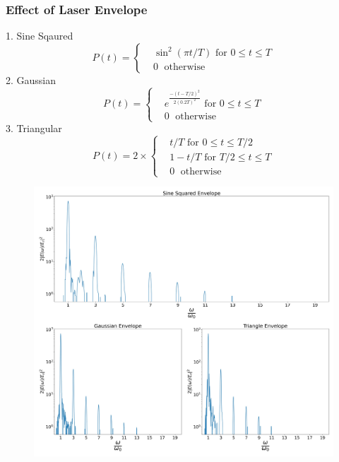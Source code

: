 \documentclass{beamer}
\begin{document}
\begin{frame}
    \frametitle{Effect of Laser Envelope}
    \tiny
    \begin{minipage}[t]{0.35\linewidth}
        1. Sine Sqaured
        \begin{equation*}\label{sin-sq-env}
            P(t)=
            \begin{cases}
                 & \sin^2(\pi t/T) \text{ for } 0 \leq t \le T \\
                 & 0         \;      \text{ otherwise }
            \end{cases}
        \end{equation*}
        2. Gaussian
        \begin{equation*}\label{gaussian-env}
            P(t)=
            \begin{cases}
                 & e^{\frac{-(t-T/2)^2}{2(0.2T)^2}} \text{ for } 0 \leq t \le T \\
                 & 0         \;      \text{ otherwise }
            \end{cases}
        \end{equation*}
        3. Triangular
        \begin{equation*}\label{triangle-env}
            P(t)= 2\times
            \begin{cases}
                 & t/T \text{ for } 0 \leq t \le T/2    \\
                 & 1-t/T \text{ for } T/2 \leq t \le T  \\
                 & 0         \;      \text{ otherwise }
            \end{cases}
        \end{equation*}
    \end{minipage}
    \begin{minipage}[t]{0.64\linewidth}
        \begin{figure}
            \centering
            \includegraphics[width=1.0\textwidth, height=0.8\textheight]{images/env.jpg}

\end{figure}
\end{minipage}
\end{frame}
\end{document}
